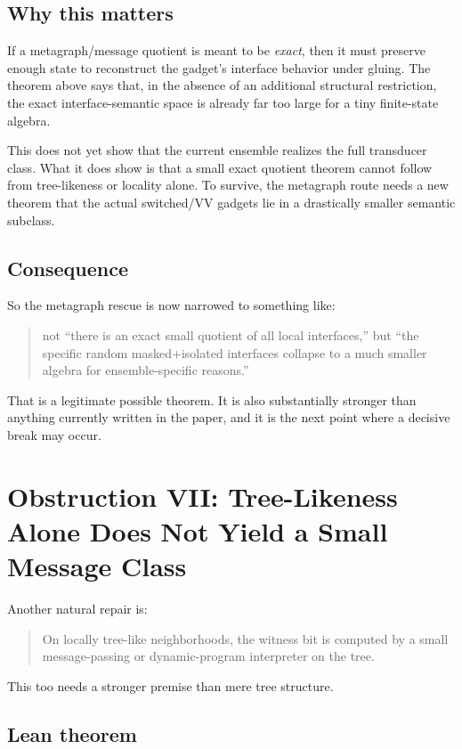 \documentclass[11pt]{article}
\theoremstyle{remark}
\begin{document}
\subsection{Why this matters}

If a metagraph/message quotient is meant to be \emph{exact}, then it must preserve enough state to
reconstruct the gadget's interface behavior under gluing.  The theorem above says that, in the
absence of an additional structural restriction, the exact interface-semantic space is already far
too large for a tiny finite-state algebra.

This does not yet show that the current ensemble realizes the full transducer class.  What it
does show is that a small exact quotient theorem cannot follow from tree-likeness or locality
alone.  To survive, the metagraph route needs a new theorem that the actual switched/VV gadgets
lie in a drastically smaller semantic subclass.

\subsection{Consequence}

So the metagraph rescue is now narrowed to something like:
\begin{quote}
not ``there is an exact small quotient of all local interfaces,''
but ``the specific random masked+isolated interfaces collapse to a much smaller algebra for
ensemble-specific reasons.''
\end{quote}

That is a legitimate possible theorem.  It is also substantially stronger than anything currently
written in the paper, and it is the next point where a decisive break may occur.

\section{Obstruction VII: Tree-Likeness Alone Does Not Yield a Small Message Class}

Another natural repair is:
\begin{quote}
On locally tree-like neighborhoods, the witness bit is computed by a small message-passing or
dynamic-program interpreter on the tree.
\end{quote}

This too needs a stronger premise than mere tree structure.

\subsection{Lean theorem}
\end{document}
